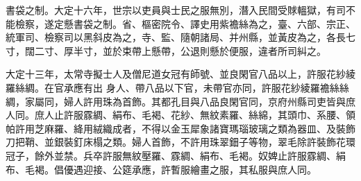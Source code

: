\begin{pinyinscope}
 書袋之制。大定十六年，世宗以吏員與士民之服無別，潛入民間受賕轀獄，有司不能檢察，遂定懸書袋之制。省、樞密院令、譯史用紫襜絲為之，臺、六部、宗正、統軍司、檢察司以黑斜皮為之，寺、監、隨朝諸局、并州縣，並黃皮為之，各長七寸，闊二寸、厚半寸，並於束帶上懸帶，公退則懸於便服，違者所司糾之。



 大定十三年，太常寺擬士人及僧尼道女冠有師號、並良閑官八品以上，許服花紗綾羅絲綢。在官承應有出
 身人、帶八品以下官，未帶官亦同，許服花紗綾羅襜絲絲綢，家屬同，婦人許用珠為首飾。其都孔目與八品良閑官同，京府州縣司吏皆與庶人同。庶人止許服霡綢、絹布、毛褐、花紗、無紋素羅、絲綿，其頭巾、系腰、領帕許用芝麻羅、絳用絨織成者，不得以金玉犀象諸寶瑪瑙玻璃之類為器皿、及裝飾刀把鞘、並銀裝釘床榻之類。婦人首飾，不許用珠翠鈿子等物，翠毛除許裝飾花環冠子，餘外並禁。兵卒許服無紋壓羅、霡綢、絹布、毛褐。奴婢止許服霡綢、絹布、毛褐。倡優遇迎接、公筵承應，許暫服繪畫之服，其私服與庶人同。



\end{pinyinscope}